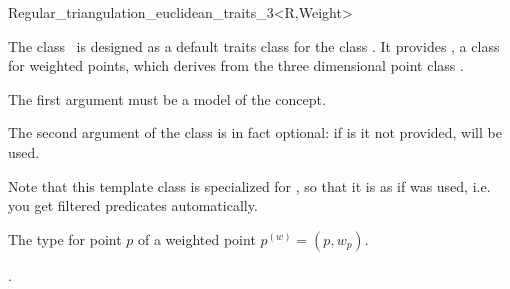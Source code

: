 

\begin{ccRefClass}{Regular_triangulation_euclidean_traits_3<R,Weight>}  %


\ccDefinition
  
The class \ccRefName\ is designed as a default traits class for the
class . 
It provides , a class for weighted points, which derives
from the three dimensional point class .

The first argument  must be a model of the  concept. 

The second argument  of the class
 is in fact
optional: if is it not provided,  will be used.

Note that this template class is specialized for
, so that it is as if
 was used, i.e. you get
filtered predicates automatically.


\ccIsModel
{}


\ccTypes
{}

{The type for point $p$ of a weighted point ${p}^{(w)}=(p,w_p)$.}
\ccGlue
{}



\ccSeeAlso

.

\end{ccRefClass}


